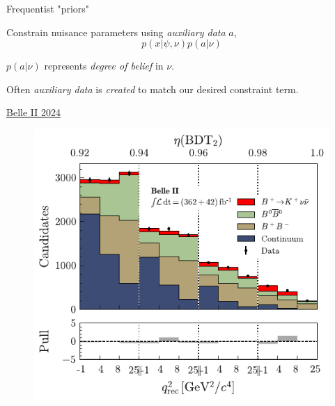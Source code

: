 \documentclass[
aspectratio=169,
14pt,
professionalfonts
]{beamer}
\begin{document}
\begin{frame}{Frequentist "priors"}
    \vspace{-0.5cm}
    \begin{minipage}{0.7\textwidth}
        Constrain nuisance parameters using \textit{auxiliary data} $a$,
        $$p(x| \psi, \nu) p(a| \nu)$$
        
        $p(a| \nu)$ represents \textit{degree of belief} in $\nu$.
        
        \vspace{0.5cm}
        
        Often \textit{auxiliary data} is \textit{created} to match our desired constraint term.

        \flushright \small
        \href{https://arxiv.org/pdf/2311.14647}{Belle II 2024}
    \end{minipage}
    \begin{minipage}{0.29\textwidth}
        \begin{figure}
            \centering
            \includegraphics[width=\textwidth]{../plots/knunu-signal.pdf}

\end{figure}
\end{minipage}
\end{frame}
\end{document}
